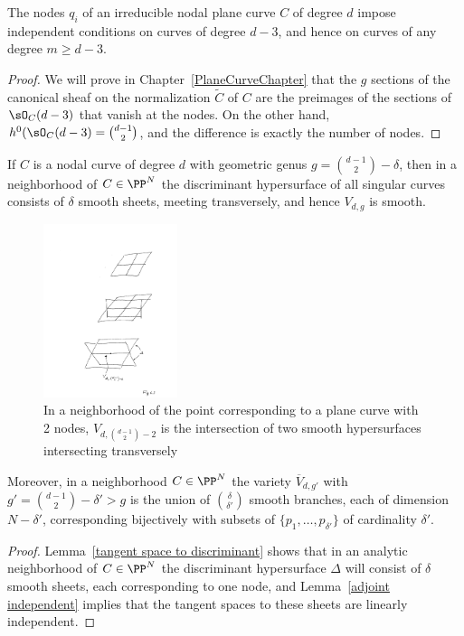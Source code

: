 \begin{lemma}\label{adjoint independent}
The nodes $q_i$ of an irreducible nodal plane curve $C$ of degree $d$ impose independent conditions on curves of degree $d-3$, and hence on curves of any degree $m \geq d-3$.
\end{lemma}
\begin{proof}
We will prove in Chapter~\ref{PlaneCurveChapter} that the $g$ sections of the canonical sheaf on the normalization $\widetilde C$ of
$C$ are the preimages of the sections of $\sO_C(d-3)$ that vanish at the nodes. On the other hand, 
$h^0(\sO_C(d-3) = \binom{d-1}{2}$, and the difference is exactly the number of nodes.
\end{proof}

\begin{corollary}\label{local geometry of Severi}
If $C$ is a nodal curve of degree $d$ with geometric genus $g = \binom{d-1}{2}-\delta$, then in a neighborhood of $C\in \PP^N$
the discriminant hypersurface of all singular curves consists of $\delta$ smooth sheets, meeting transversely, and hence
$V_{d,g}$ is smooth. 

\begin{figure}
 \caption{In a neighborhood of the point corresponding to a plane curve with 2 nodes, $V_{d, \binom{d-1}{2}-2}$ is the intersection of two smooth hypersurfaces intersecting transversely}
\centerline {\includegraphics[height=2in]{"Fig6.3.pdf"}}
\end{figure}

Moreover, in a neighborhood  $C \in \PP^N$ 
the variety $\overline V_{d,g'}$ with $g' =  \binom{d-1}{2}-\delta' > g$ is the union of $\binom{\delta}{\delta'}$ smooth branches, each of dimension $N - \delta'$, corresponding bijectively with subsets of $\{p_1,\dots,p_{\delta'}\}$ of cardinality $\delta'$.
\end{corollary}
\begin{proof}
Lemma~\ref{tangent space to discriminant} shows that in an analytic neighborhood of $C\in \PP^N$ the discriminant hypersurface $\Delta$ will consist of $\delta$ smooth sheets, each corresponding to one node, and Lemma~\ref{adjoint independent} implies that the tangent spaces to these sheets are linearly independent. 
\end{proof}


